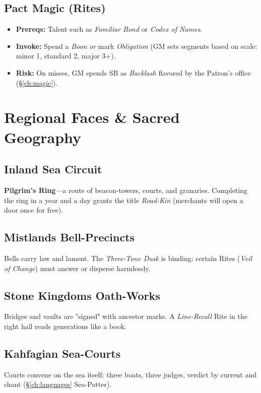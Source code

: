 \subsection*{Pact Magic (Rites)}
\begin{itemize}
  \item \textbf{Prereqs:} Talent such as \emph{Familiar Bond} or \emph{Codex of Names}. 
  \item \textbf{Invoke:} Spend a \emph{Boon} \emph{or} mark \emph{Obligation} (GM sets segments based on scale: minor 1, standard 2, major 3+).
  \item \textbf{Risk:} On misses, GM spends SB as \emph{Backlash} flavored by the Patron's office (\S\ref{ch:magic}).
\end{itemize}

\section{Regional Faces \& Sacred Geography}

\subsection*{Inland Sea Circuit}
\textbf{Pilgrim's Ring}—a route of beacon-towers, courts, and granaries. Completing the ring in a year and a day grants the title \emph{Road-Kin} (merchants will open a door once for free). 

\subsection*{Mistlands Bell-Precincts}
Bells carry law and lament. The \emph{Three-Tone Dusk} is binding: certain Rites (\emph{Veil of Change}) must answer or disperse harmlessly.

\subsection*{Stone Kingdoms Oath-Works}
Bridges and vaults are "signed" with ancestor marks. A \emph{Line-Recall} Rite in the right hall reads generations like a book.

\subsection*{Kahfagian Sea-Courts}
Courts convene on the sea itself: three boats, three judges, verdict by current and chant (\S\ref{ch:languages} Sea-Patter).

